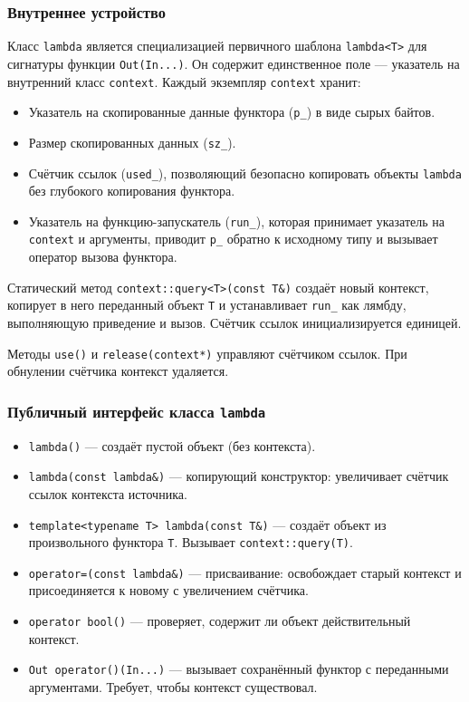 \documentclass[a4paper,12pt]{article}
\begin{document}
\subsubsection{Внутреннее устройство}

Класс \texttt{lambda} является специализацией первичного шаблона \texttt{lambda<T>} для сигнатуры функции \texttt{Out(In...)}. Он содержит единственное поле — указатель на внутренний класс \texttt{context}. Каждый экземпляр \texttt{context} хранит:

\begin{itemize}
    \item Указатель на скопированные данные функтора (\texttt{p\_}) в виде сырых байтов.
    \item Размер скопированных данных (\texttt{sz\_}).
    \item Счётчик ссылок (\texttt{used\_}), позволяющий безопасно копировать объекты \texttt{lambda} без глубокого копирования функтора.
    \item Указатель на функцию-запускатель (\texttt{run\_}), которая принимает указатель на \texttt{context} и аргументы, приводит \texttt{p\_} обратно к исходному типу и вызывает оператор вызова функтора.
\end{itemize}

Статический метод \texttt{context::query<T>(const T\&)} создаёт новый контекст, копирует в него переданный объект \texttt{T} и устанавливает \texttt{run\_} как лямбду, выполняющую приведение и вызов. Счётчик ссылок инициализируется единицей.

Методы \texttt{use()} и \texttt{release(context*)} управляют счётчиком ссылок. При обнулении счётчика контекст удаляется.

\subsubsection{Публичный интерфейс класса \texttt{lambda}}

\begin{itemize}
    \item \texttt{lambda()} — создаёт пустой объект (без контекста).
    \item \texttt{lambda(const lambda\&)} — копирующий конструктор: увеличивает счётчик ссылок контекста источника.
    \item \texttt{template<typename T> lambda(const T\&)} — создаёт объект из произвольного функтора \texttt{T}. Вызывает \texttt{context::query(T)}.
    \item \texttt{operator=(const lambda\&)} — присваивание: освобождает старый контекст и присоединяется к новому с увеличением счётчика.
    \item \texttt{operator bool()} — проверяет, содержит ли объект действительный контекст.
    \item \texttt{Out operator()(In...)} — вызывает сохранённый функтор с переданными аргументами. Требует, чтобы контекст существовал.
\end{itemize}
\end{document}
